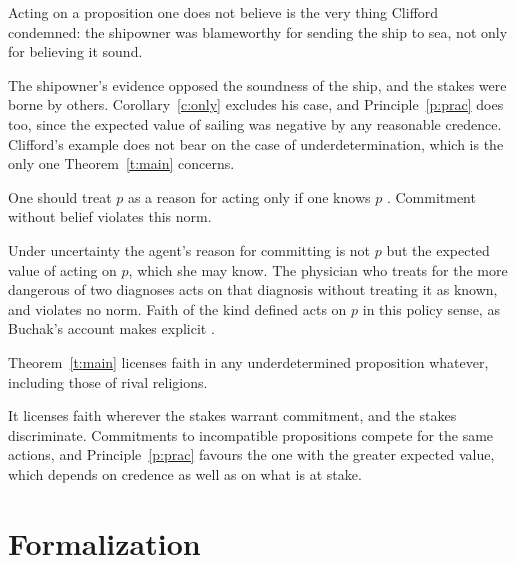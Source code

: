 \documentclass{situationist-preprint}
\begin{document}
\begin{objection}[Clifford]
Acting on a proposition one does not believe is the very thing Clifford condemned: the shipowner was blameworthy for sending the ship to sea, not only for believing it sound.
\end{objection}

\begin{reply}
The shipowner's evidence opposed the soundness of the ship, and the stakes were borne by others. Corollary~\ref{c:only} excludes his case, and Principle~\ref{p:prac} does too, since the expected value of sailing was negative by any reasonable credence. Clifford's example does not bear on the case of underdetermination, which is the only one Theorem~\ref{t:main} concerns.
\end{reply}

\begin{objection}
One should treat $p$ as a reason for acting only if one knows $p$ \citep{HawthorneStanley2008}. Commitment without belief violates this norm.
\end{objection}

\begin{reply}
Under uncertainty the agent's reason for committing is not $p$ but the expected value of acting on $p$, which she may know. The physician who treats for the more dangerous of two diagnoses acts on that diagnosis without treating it as known, and violates no norm. Faith of the kind defined acts on $p$ in this policy sense, as Buchak's account makes explicit \citep{Buchak2012}.
\end{reply}

\begin{objection}
Theorem~\ref{t:main} licenses faith in any underdetermined proposition whatever, including those of rival religions.
\end{objection}

\begin{reply}
It licenses faith wherever the stakes warrant commitment, and the stakes discriminate. Commitments to incompatible propositions compete for the same actions, and Principle~\ref{p:prac} favours the one with the greater expected value, which depends on credence as well as on what is at stake.
\end{reply}

\section{Formalization}
\end{document}
